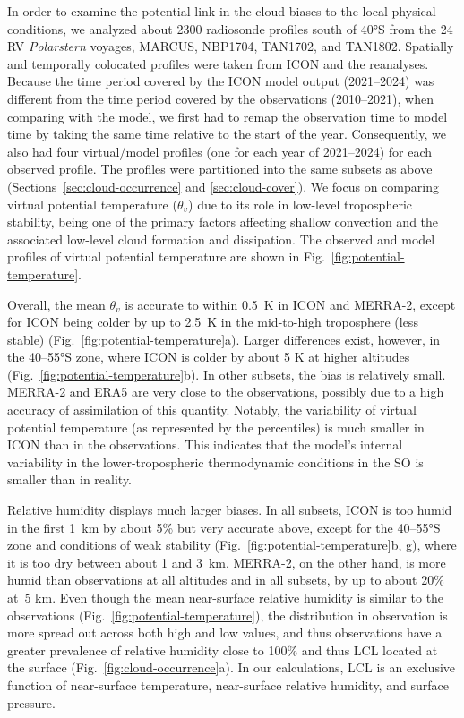 \documentclass[draft]{agujournal2019}
\begin{document}
In order to examine the potential link in the cloud biases to the local physical conditions, we analyzed about 2300 radiosonde profiles south of 40°S from the 24 RV \emph{Polarstern} voyages, MARCUS, NBP1704, TAN1702, and TAN1802. Spatially and temporally colocated profiles were taken from ICON and the reanalyses. Because the time period covered by the ICON model output (2021--2024) was different from the time period covered by the observations (2010--2021), when comparing with the model, we first had to remap the observation time to model time by taking the same time relative to the start of the year. Consequently, we also had four virtual/model profiles (one for each year of 2021--2024) for each observed profile. The profiles were partitioned into the same subsets as above (Sections~\ref{sec:cloud-occurrence} and \ref{sec:cloud-cover}). We focus on comparing virtual potential temperature ($\theta_v$) due to its role in low-level tropospheric stability, being one of the primary factors affecting shallow convection and the associated low-level cloud formation and dissipation. The observed and model profiles of virtual potential temperature are shown in Fig.~\ref{fig:potential-temperature}.

Overall, the mean $\theta_v$ is accurate to within 0.5~K in ICON and MERRA-2, except for ICON being colder by up to 2.5~K in the mid-to-high troposphere (less stable) (Fig.~\ref{fig:potential-temperature}a). Larger differences exist, however, in the 40--55°S zone, where ICON is colder by about 5 K at higher altitudes (Fig.~\ref{fig:potential-temperature}b). In other subsets, the bias is relatively small. MERRA-2 and ERA5 are very close to the observations, possibly due to a high accuracy of assimilation of this quantity. Notably, the variability of virtual potential temperature (as represented by the percentiles) is much smaller in ICON than in the observations. This indicates that the model's internal variability in the lower-tropospheric thermodynamic conditions in the SO is smaller than in reality.

Relative humidity displays much larger biases. In all subsets, ICON is too humid in the first 1~km by about 5\% but very accurate above, except for the 40--55°S zone and conditions of weak stability (Fig.~\ref{fig:potential-temperature}b, g), where it is too dry between about 1 and 3~km. MERRA-2, on the other hand, is more humid than observations at all altitudes and in all subsets, by up to about 20\% at~5 km. Even though the mean near-surface relative humidity is similar to the observations (Fig.~\ref{fig:potential-temperature}), the distribution in observation is more spread out across both high and low values, and thus observations have a greater prevalence of relative humidity close to 100\% and thus LCL located at the surface (Fig.~\ref{fig:cloud-occurrence}a). In our calculations, LCL is an exclusive function of near-surface temperature, near-surface relative humidity, and surface pressure.
\end{document}

